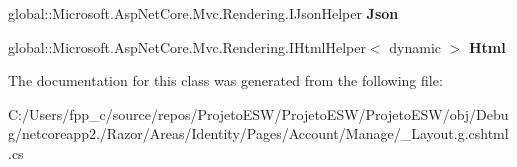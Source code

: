 \begin{DoxyCompactItemize}
\item 
\mbox{\label{class_projeto_e_s_w_1_1_areas_1_1_identity_1_1_pages_1_1_account_1_1_manage_1_1_areas___identityc6380326995a7c32954b2e75619ca337_ae3fc4c3353d2a1e1c88b04ff058928a6}} 
global\+::\+Microsoft.\+Asp\+Net\+Core.\+Mvc.\+Rendering.\+I\+Json\+Helper {\bfseries Json}
\item 
\mbox{\label{class_projeto_e_s_w_1_1_areas_1_1_identity_1_1_pages_1_1_account_1_1_manage_1_1_areas___identityc6380326995a7c32954b2e75619ca337_a5631d913ec43968e4b65795b39174d77}} 
global\+::\+Microsoft.\+Asp\+Net\+Core.\+Mvc.\+Rendering.\+I\+Html\+Helper$<$ dynamic $>$ {\bfseries Html}
\end{DoxyCompactItemize}


The documentation for this class was generated from the following file\+:\begin{DoxyCompactItemize}
\item 
C\+:/\+Users/fpp\+\_\+c/source/repos/\+Projeto\+E\+S\+W/\+Projeto\+E\+S\+W/\+Projeto\+E\+S\+W/obj/\+Debug/netcoreapp2./\+Razor/\+Areas/\+Identity/\+Pages/\+Account/\+Manage/\+\_\+\+Layout.\+g.\+cshtml.\+cs\end{DoxyCompactItemize}
